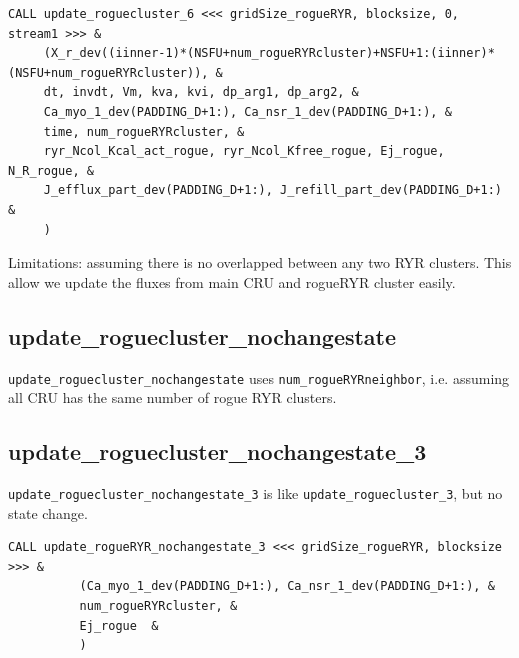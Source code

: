{\small
\begin{verbatim}
CALL update_roguecluster_6 <<< gridSize_rogueRYR, blocksize, 0, stream1 >>> &  
     (X_r_dev((iinner-1)*(NSFU+num_rogueRYRcluster)+NSFU+1:(iinner)*(NSFU+num_rogueRYRcluster)), &
     dt, invdt, Vm, kva, kvi, dp_arg1, dp_arg2, & 
     Ca_myo_1_dev(PADDING_D+1:), Ca_nsr_1_dev(PADDING_D+1:), & 
     time, num_rogueRYRcluster, & 
     ryr_Ncol_Kcal_act_rogue, ryr_Ncol_Kfree_rogue, Ej_rogue, N_R_rogue, & 
     J_efflux_part_dev(PADDING_D+1:), J_refill_part_dev(PADDING_D+1:) & 
     )
\end{verbatim}}

Limitations: assuming there is no overlapped between any two RYR clusters. This
allow we update the fluxes from main CRU and rogueRYR cluster easily.

\subsection{update\_roguecluster\_nochangestate}

\verb!update_roguecluster_nochangestate! uses \verb!num_rogueRYRneighbor!, i.e.
assuming all CRU has the same number of rogue RYR clusters.

\subsection{update\_roguecluster\_nochangestate\_3}

\verb!update_roguecluster_nochangestate_3! is like
\verb!update_roguecluster_3!, but no state change.

\begin{verbatim}
CALL update_rogueRYR_nochangestate_3 <<< gridSize_rogueRYR, blocksize >>> &                                                                                                                                    
          (Ca_myo_1_dev(PADDING_D+1:), Ca_nsr_1_dev(PADDING_D+1:), &                                                                                                                                                
          num_rogueRYRcluster, &                                                                                                                                                                                    
          Ej_rogue  &                                                                                                                                                                                               
          )              
\end{verbatim}

